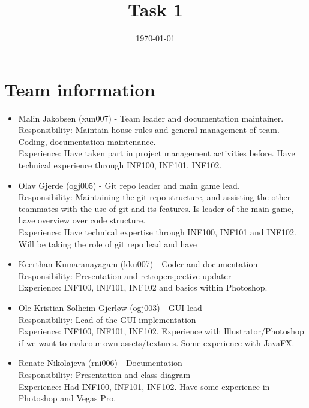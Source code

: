 \documentclass[12pt]{article}%
\begin{document}
\title{Task 1}
\date{\today}
\maketitle
\section{Team information}




\begin{itemize}
\item Malin Jakobsen (xun007) - Team leader and documentation maintainer. \\
Responsibility: Maintain house rules and general management of team. Coding, documentation maintenance. \\
	Experience: Have taken part in project management activities before. Have technical
experience through INF100, INF101, INF102.

\item Olav Gjerde (ogj005) - Git repo leader and main game lead. \\
Responsibility: Maintaining the git repo structure, and assisting the other teammates
with the use of git and its features. Is leader of the main game, have overview over code structure. \\
Experience: Have technical expertise through INF100, INF101 and INF102. Will be
taking the role of git repo lead and have
\item Keerthan Kumaranayagam (kku007) -  Coder and documentation\\
Responsibility: Presentation and retroperspective updater\\
Experience: INF100, INF101, INF102 and basics within Photoshop.
\item Ole Kristian Solheim Gjerløw (ogj003) - GUI lead\\
Responsibility: Lead of the GUI implementation\\
Experience: INF100, INF101, INF102. Experience with Illustrator/Photoshop if we want to makeour own assets/textures. Some experience with JavaFX.
\item Renate Nikolajeva (rni006) - Documentation\\
Responsibility: Presentation and class diagram\\
	Experience: Had INF100, INF101, INF102. Have some experience in Photoshop and
Vegas Pro.


\end{itemize}
\end{document}
